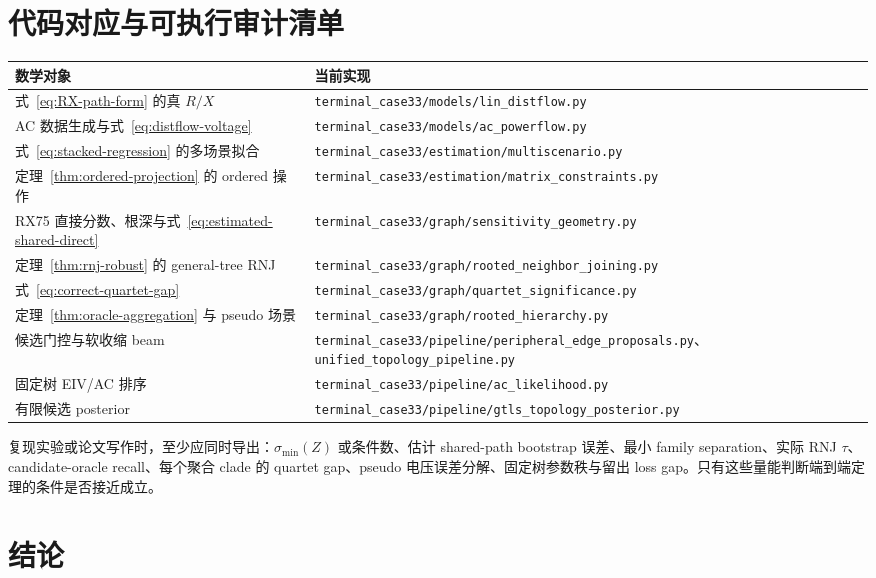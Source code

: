 \documentclass[UTF8,11pt]{ctexart}
\begin{document}
\section{代码对应与可执行审计清单}

\begin{longtable}{p{5.3cm}p{9.4cm}}
\toprule
数学对象 & 当前实现 \\
\midrule
式~\eqref{eq:RX-path-form} 的真 $R/X$ & \texttt{terminal\_case33/models/lin\_distflow.py} \\
AC 数据生成与式~\eqref{eq:distflow-voltage} & \texttt{terminal\_case33/models/ac\_powerflow.py} \\
式~\eqref{eq:stacked-regression} 的多场景拟合 & \texttt{terminal\_case33/estimation/multiscenario.py} \\
定理~\ref{thm:ordered-projection} 的 ordered 操作 & \texttt{terminal\_case33/estimation/matrix\_constraints.py} \\
RX75 直接分数、根深与式~\eqref{eq:estimated-shared-direct} & \texttt{terminal\_case33/graph/sensitivity\_geometry.py} \\
定理~\ref{thm:rnj-robust} 的 general-tree RNJ & \texttt{terminal\_case33/graph/rooted\_neighbor\_joining.py} \\
式~\eqref{eq:correct-quartet-gap} & \texttt{terminal\_case33/graph/quartet\_significance.py} \\
定理~\ref{thm:oracle-aggregation} 与 pseudo 场景 & \texttt{terminal\_case33/graph/rooted\_hierarchy.py} \\
候选门控与软收缩 beam & \texttt{terminal\_case33/pipeline/peripheral\_edge\_proposals.py}、\texttt{unified\_topology\_pipeline.py} \\
固定树 EIV/AC 排序 & \texttt{terminal\_case33/pipeline/ac\_likelihood.py} \\
有限候选 posterior & \texttt{terminal\_case33/pipeline/gtls\_topology\_posterior.py} \\
\bottomrule
\end{longtable}

复现实验或论文写作时，至少应同时导出：$\sigma_{\min}(Z)$ 或条件数、估计
shared-path bootstrap 误差、最小 family separation、实际 RNJ $\tau$、candidate-oracle
recall、每个聚合 clade 的 quartet gap、pseudo 电压误差分解、固定树参数秩与留出
loss gap。只有这些量能判断端到端定理的条件是否接近成立。

\section{结论}
\end{document}
